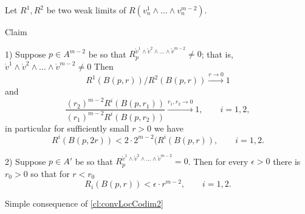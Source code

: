 Let $R^1, R^2$ be two weak limits
of  $R(v^1_n\wedge\dots\wedge v^{m-2}_n )$.

\begin{thm}{Claim}\label{cl:R12loc}


1) Suppose $p\in A^{m-2}$ be so that $R_p^{\mathring{v}^1\wedge \mathring{v}^2\wedge\dots\wedge \mathring{v}^{m-2}}\neq 0$; that is,
$\mathring{v}^1\wedge \mathring{v}^2\wedge\dots\wedge \mathring{v}^{m-2}\neq 0$
Then
$$R^1(B(p,r))/R^2(B(p,r))\xrightarrow{r\to 0} 1$$
and
$$\frac{(r_2)^{m-2}R^i(B(p,r_1))}{(r_1)^{m-2}R^i(B(p,r_2))}\xrightarrow{r_1, r_2\to 0} 1, \qquad i=1, 2,$$
in particular for sufficiently small $r>0$
we have
$$ R^i(B(p,2r))<2\cdot 2^{m-2}(R^i(B(p,r)),\qquad i=1, 2.$$

2) Suppose $p\in A'$ be so that $R_p^{\mathring{v}^1\wedge \mathring{v}^2\wedge\dots\wedge \mathring{v}^{m-2}}= 0$.
Then for every $\epsilon>0$ there is $r_0>0$ so that
for $r<r_0$
$$ R_i(B(p,r))<\epsilon\cdot r^{m-2},\qquad i=1, 2.$$
\end{thm}

 Simple consequence of \ref{cl:convLocCodim2} \qeds
